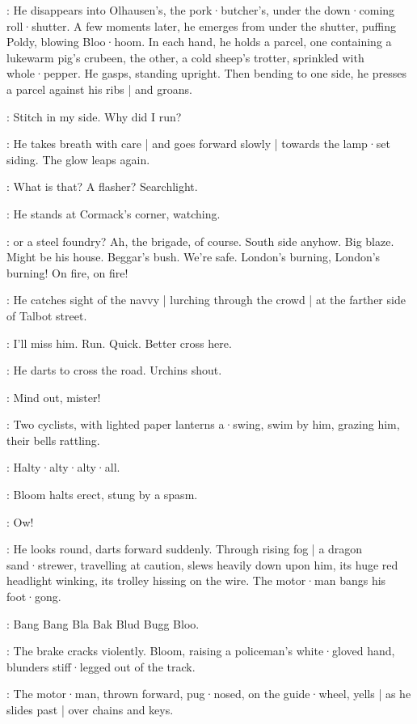 :
He disappears into Olhausen's,
the pork·butcher's,
under the down·coming roll·shutter.
A few moments later,
he emerges from under the shutter,
puffing Poldy,
blowing Bloo·hoom.
In each hand,
he holds a parcel,
one containing a lukewarm pig's crubeen,
the other,
a cold sheep's trotter,
sprinkled with whole·pepper.
He gasps,
standing upright.%
Then bending to one side,
he presses a parcel against his ribs |
and groans.

\Bloom:
Stitch in my side.
Why did I run?

:
He takes breath with care |
and goes forward slowly |
towards the lamp·set siding.
The glow leaps again.

\Bloom:
What is that?
A flasher?
Searchlight.

:
He stands at Cormack's corner,
watching.

\Bloom:
or a steel foundry?
Ah,
the brigade,
of course.
South side anyhow.
Big blaze.
Might be his house.
Beggar's bush.
We're safe.
London's burning,
London's burning!
On fire,
on fire!

:
He catches sight of the navvy |
lurching through the crowd |
at the farther side of Talbot street.

\Bloom:
I'll miss him.
Run.
Quick.
Better cross here.

:
He darts to cross the road.
Urchins shout.

\Urchins:
Mind out,
mister!

:
Two cyclists,
with lighted paper lanterns a·swing,
swim by him,
grazing him,
their bells rattling.

\Bells:
Halty·alty·alty·all.

:
Bloom halts erect,
stung by a spasm.

\Bloom:
Ow!

:
He looks round,
darts forward suddenly.
Through rising fog |
a dragon sand·strewer,
travelling at caution,
slews heavily down upon him,
its huge red headlight winking,
its trolley hissing on the wire.
The motor·man bangs his foot·gong.

\Gong:
Bang Bang Bla Bak Blud Bugg Bloo.

:
The brake cracks violently.
Bloom,
raising a policeman's white·gloved hand,
blunders stiff·legged out of the track.

:
The motor·man,
thrown forward,
pug·nosed,
on the guide·wheel,
yells |
as he slides past |
over chains and keys.


